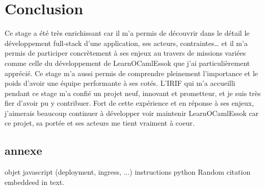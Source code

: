 \documentclass{article}
\begin{document}
\newpage

\section{Conclusion}

Ce stage a été très enrichissant car il m’a permis de découvrir dans le détail le développement full-stack d'une application, ses acteurs, contraintes… et il m’a permis de participer concrètement à ses enjeux au travers de missions variées comme celle du développement de LearnOCamlEssok que j’ai particulièrement apprécié. Ce stage m’a aussi permis de comprendre pleinement l'importance et le poids d'avoir une équipe performante à ses cotés.
\newline
L'IRIF qui m’a accueilli pendant ce stage m'a confié un projet neuf, innovant et prometteur, et je suis très fier d’avoir pu y contribuer.
\newline
\newline
Fort de cette expérience et en réponse à ses enjeux, j’aimerais beaucoup continuer à développer voir maintenir LearnOCamlEssok car ce projet, sa portée et ses acteurs me tient vraiment à coeur.




\newpage

\subsection{annexe}
objet javascript (deployment, ingress, ...)
instructions python
Random citation \cite{cloudarchitectmusings} embeddeed in text.

\newpage
\end{document}

